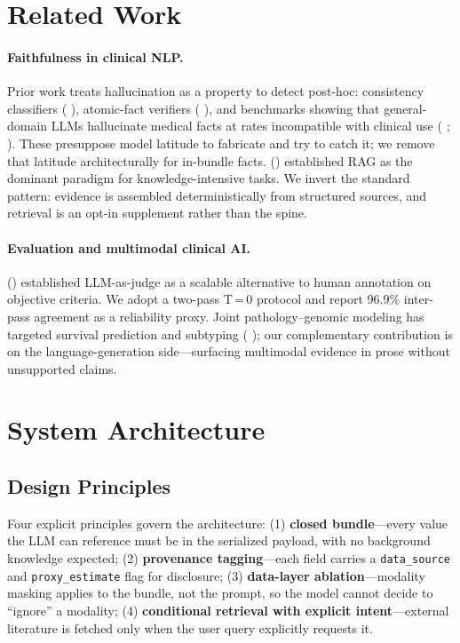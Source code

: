 \documentclass[11pt]{article}
\begin{document}
\section{Related Work}

\paragraph{Faithfulness in clinical NLP.}
Prior work treats hallucination as a property to detect post-hoc: consistency classifiers (\citeauthor{kryscinski2020evaluating} \citeyear{kryscinski2020evaluating}), atomic-fact verifiers (\citeauthor{min2023factscore} \citeyear{min2023factscore}), and benchmarks showing that general-domain LLMs hallucinate medical facts at rates incompatible with clinical use (\citeauthor{umapathi2023med} \citeyear{umapathi2023med}; \citeauthor{ji2023survey} \citeyear{ji2023survey}). These presuppose model latitude to fabricate and try to catch it; we remove that latitude architecturally for in-bundle facts. \citeauthor{lewis2020rag} (\citeyear{lewis2020rag}) established RAG as the dominant paradigm for knowledge-intensive tasks. We invert the standard pattern: evidence is assembled deterministically from structured sources, and retrieval is an opt-in supplement rather than the spine.

\paragraph{Evaluation and multimodal clinical AI.}
\citeauthor{zheng2023judging} (\citeyear{zheng2023judging}) established LLM-as-judge as a scalable alternative to human annotation on objective criteria. We adopt a two-pass T\,=\,0 protocol and report 96.9\% inter-pass agreement as a reliability proxy. Joint pathology--genomic modeling has targeted survival prediction and subtyping (\citeauthor{chen2022multimodal} \citeyear{chen2022multimodal}); our complementary contribution is on the language-generation side—surfacing multimodal evidence in prose without unsupported claims.

\section{System Architecture}

\subsection{Design Principles}

Four explicit principles govern the architecture: (1) \textbf{closed bundle}—every value the LLM can reference must be in the serialized payload, with no background knowledge expected; (2) \textbf{provenance tagging}—each field carries a \texttt{data\_source} and \texttt{proxy\_estimate} flag for disclosure; (3) \textbf{data-layer ablation}—modality masking applies to the bundle, not the prompt, so the model cannot decide to ``ignore'' a modality; (4) \textbf{conditional retrieval with explicit intent}—external literature is fetched only when the user query explicitly requests it.
\end{document}
